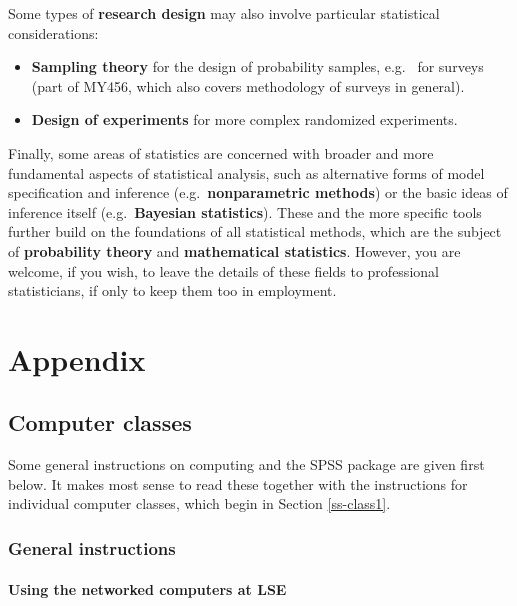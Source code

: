 \documentclass[11pt,a4paper,openany]{book}
\begin{document}
Some types of \textbf{research design} may also involve particular
statistical considerations:

\begin{itemize}
\item
  \textbf{Sampling theory} for the design of probability samples, e.g.~
  for surveys (part of MY456, which also covers methodology of surveys
  in general).
\item
  \textbf{Design of experiments} for more complex randomized
  experiments.
\end{itemize}

Finally, some areas of statistics are concerned with broader and more
fundamental aspects of statistical analysis, such as alternative forms
of model specification and inference (e.g.~\textbf{nonparametric
methods}) or the basic ideas of inference itself (e.g.~\textbf{Bayesian
statistics}). These and the more specific tools further build on the
foundations of all statistical methods, which are the subject of
\textbf{probability theory} and \textbf{mathematical statistics}.
However, you are welcome, if you wish, to leave the details of these
fields to professional statisticians, if only to keep them too in
employment.

\backmatter

\chapter*{Appendix}\label{appendix}

\section{Computer classes}\label{c-class0}

\setcounter{section}{-1}

Some general instructions on computing and the SPSS package are given
first below. It makes most sense to read these together with the
instructions for individual computer classes, which begin in Section
\ref{ss-class1}.

\subsection{General instructions}\label{general-instructions}

\subsubsection*{Using the networked computers at
LSE}\label{using-the-networked-computers-at-lse}
\end{document}
